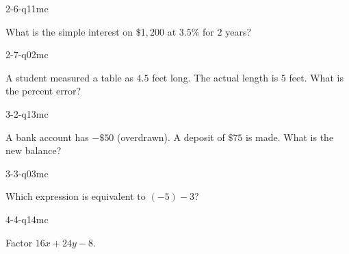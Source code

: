 \begin{practiceQuestion}{2-6-q11}{mc}
\begin{questionText}
What is the simple interest on $\$1{,}200$ at $3.5\%$ for $2$ years?
\end{questionText}
\end{practiceQuestion}

\begin{practiceQuestion}{2-7-q02}{mc}
\begin{questionText}
A student measured a table as $4.5$ feet long. The actual length is $5$ feet. What is the percent error?
\end{questionText}
\end{practiceQuestion}

\begin{practiceQuestion}{3-2-q13}{mc}
\begin{questionText}
A bank account has $-\$50$ (overdrawn). A deposit of $\$75$ is made. What is the new balance?
\end{questionText}
\end{practiceQuestion}

\begin{practiceQuestion}{3-3-q03}{mc}
\begin{questionText}
Which expression is equivalent to $(-5) - 3$?
\end{questionText}
\end{practiceQuestion}

\begin{practiceQuestion}{4-4-q14}{mc}
\begin{questionText}
Factor $16x + 24y - 8$.
\end{questionText}
\end{practiceQuestion}

